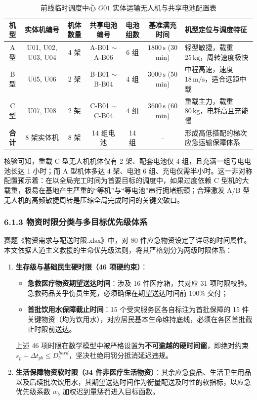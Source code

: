 \documentclass[withoutpreface,bwprint]{format}
\begin{document}
\begin{table}[H]
\centering
\small
\caption{前线临时调度中心 $O01$ 实体运输无人机与共享电池配置表}
\label{tab:resources_inventory}
\begin{tabularx}{\textwidth}{c c c c c c >{\raggedright\arraybackslash}X}
\toprule
\textbf{机型} & \textbf{实体机编号} & \textbf{机体数量} & \textbf{共享电池编号} & \textbf{电池组数} & \textbf{基准满充时间} & \textbf{机型定位与调度特征} \\
\midrule
A 型 & U01, U02, U03, U04 & 4 架 & A-B01 $\sim$ A-B06 & 6 组 & $1800\,\text{s}$ (30 min) & 轻型敏捷，载重 $25\,\text{kg}$，周转速度极快 \\
B 型 & U05, U06 & 2 架 & B-B01 $\sim$ B-B04 & 4 组 & $3000\,\text{s}$ (50 min) & 中程高速，速度 $18\,\text{m/s}$，适合远距中载 \\
C 型 & U07, U08 & 2 架 & C-B01 $\sim$ C-B04 & 4 组 & $3600\,\text{s}$ (60 min) & 重载主力，载重 $80\,\text{kg}$，电耗高且充能慢 \\
\midrule
\textbf{合计} & 8 架实体机 & 8 架 & 14 组电池 & 14 组 & -- & 形成高低搭配的梯次应急运输保障体系 \\
\bottomrule
\end{tabularx}
\end{table}

核验可知，重载 C 型无人机机体仅有 2 架、配套电池仅 4 组，且充满一组亏电电池长达 1 小时；而 A 型机体多达 4 架、电池 6 组、充电仅需半小时。这一非对称配置预示着：在以全局完工时间为首要目标的调度中，如果过度依赖 C 型机的大载重，极易在基地产生严重的“等机”与“等电池”串行拥堵瓶颈；合理激发 A/B 型无人机的高频敏捷周转是压缩全局完成时间的关键突破口。

\subsubsection{6.1.3 物资时限分类与多目标优先级体系}
赛题《物资需求与配送时限.xlsx》中，对 80 件应急物资设定了详尽的时间属性。本文依据人道主义救援的生命优先级法则，将其严格划分为两级时限体系：
\begin{enumerate}[leftmargin=*]
    \item \textbf{生存级与基础民生硬时限（46 项硬约束）}：
    \begin{itemize}
        \item \textbf{急救医疗物资期望送达时间}：涉及 16 件医疗箱，共对应 31 项时限校验。急救药品关乎伤员生死，必须确保在期望送达时间前 $100\%$ 交付；
        \item \textbf{首批饮用水保障截止时间}：15 个受灾服务区各自标注为首批保障的 15 件关键物资（均为饮用水），对应居民基本生命维持底线，必须在各区首批截止时限前送达。
    \end{itemize}
    上述 46 项时限在数学模型中被严格设置为\textbf{不可逾越的硬时间窗}，即绝对约束 $s_p + \Delta t_{pb} \le D_b^{hard}$，坚决杜绝用罚分抵消延迟违规。
    \item \textbf{生活保障物资软时限（34 件非医疗生活物资）}：其余应急食品、生活卫生用品以及后续批次饮用水，其期望送达时间作为衡量配送及时性的软指标，以应急优先级系数 $w_b$ 加权迟到量惩罚进入目标函数。
\end{enumerate}
\end{document}
